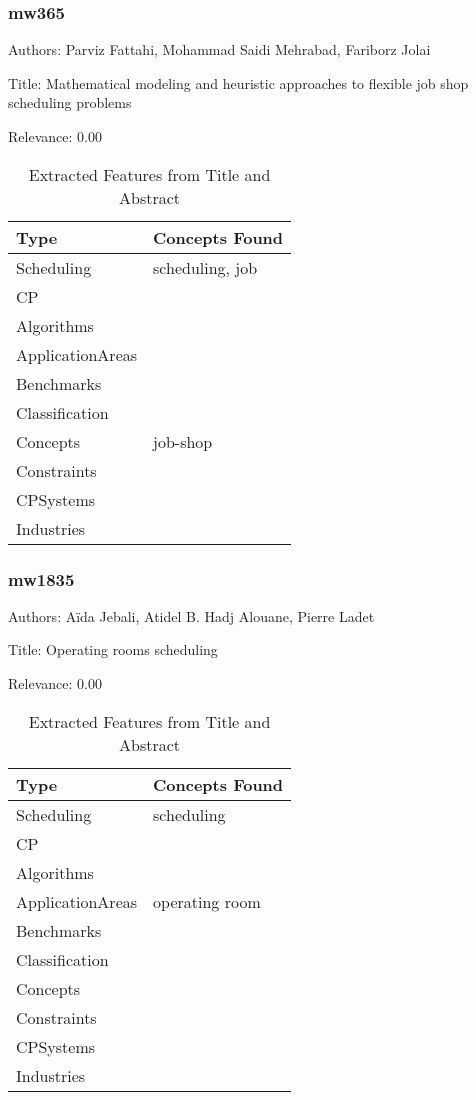 \subsubsection{mw365}
\label{mw:mw365}

Authors: Parviz Fattahi, Mohammad Saidi Mehrabad, Fariborz Jolai

Title: Mathematical modeling and heuristic approaches to flexible job shop scheduling problems

Relevance:  0.00

{\scriptsize
\begin{longtable}{p{2cm}p{20cm}}
\caption{Extracted Features from Title and Abstract}\\ \toprule
Type & Concepts Found\\ \midrule
\endhead
\bottomrule
\endfoot
Scheduling & scheduling, job\\ 
CP & \\ 
Algorithms & \\ 
ApplicationAreas & \\ 
Benchmarks & \\ 
Classification & \\ 
Concepts & job-shop\\ 
Constraints & \\ 
CPSystems & \\ 
Industries & \\ 
\end{longtable}
}



\subsubsection{mw1835}
\label{mw:mw1835}

Authors: Aïda Jebali, Atidel B. Hadj Alouane, Pierre Ladet

Title: Operating rooms scheduling

Relevance:  0.00

{\scriptsize
\begin{longtable}{p{2cm}p{20cm}}
\caption{Extracted Features from Title and Abstract}\\ \toprule
Type & Concepts Found\\ \midrule
\endhead
\bottomrule
\endfoot
Scheduling & scheduling\\ 
CP & \\ 
Algorithms & \\ 
ApplicationAreas & operating room\\ 
Benchmarks & \\ 
Classification & \\ 
Concepts & \\ 
Constraints & \\ 
CPSystems & \\ 
Industries & \\ 
\end{longtable}
}



